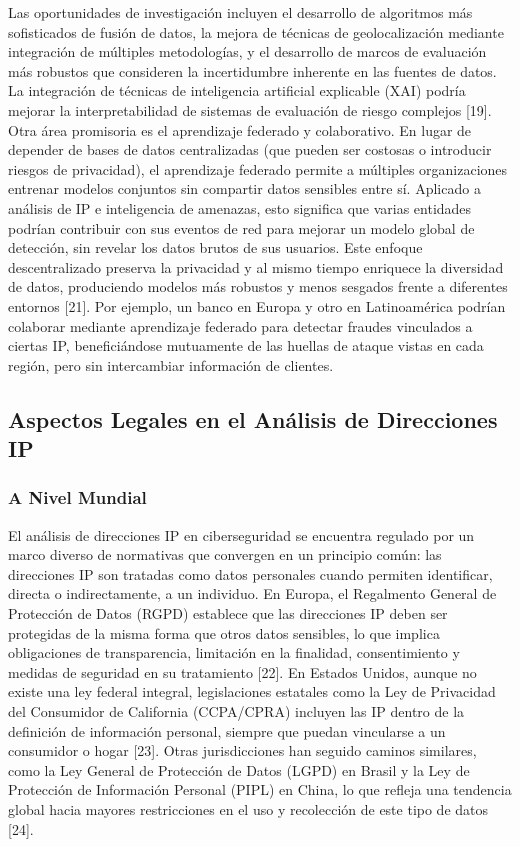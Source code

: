 Las oportunidades de investigación incluyen el desarrollo de algoritmos más sofisticados de fusión de datos, la mejora de técnicas de geolocalización mediante integración de múltiples metodologías, y el desarrollo de marcos de evaluación más robustos que consideren la incertidumbre inherente en las fuentes de datos. La integración de técnicas de inteligencia artificial explicable (XAI) podría mejorar la interpretabilidad de sistemas de evaluación de riesgo complejos [19]. \\
Otra área promisoria es el aprendizaje federado y colaborativo. En lugar de depender de bases de datos centralizadas (que pueden ser costosas o introducir riesgos de privacidad), el aprendizaje federado permite a múltiples organizaciones entrenar modelos conjuntos sin compartir datos sensibles entre sí. Aplicado a análisis de IP e inteligencia de amenazas, esto significa que varias entidades podrían contribuir con sus eventos de red para mejorar un modelo global de detección, sin revelar los datos brutos de sus usuarios. Este enfoque descentralizado preserva la privacidad y al mismo tiempo enriquece la diversidad de datos, produciendo modelos más robustos y menos sesgados frente a diferentes entornos [21]. Por ejemplo, un banco en Europa y otro en Latinoamérica podrían colaborar mediante aprendizaje federado para detectar fraudes vinculados a ciertas IP, beneficiándose mutuamente de las huellas de ataque vistas en cada región, pero sin intercambiar información de clientes.

\subsection{Aspectos Legales en el Análisis de Direcciones IP}
\subsubsection{A Nivel Mundial}
El análisis de direcciones IP en ciberseguridad se encuentra regulado por un marco diverso de normativas que convergen en un principio común: las direcciones IP son tratadas como datos personales cuando permiten identificar, directa o indirectamente, a un individuo. En Europa, el Regalmento General de Protección de Datos (RGPD) establece que las direcciones IP deben ser protegidas de la misma forma que otros datos sensibles, lo que implica obligaciones de transparencia, limitación en la finalidad, consentimiento y medidas de seguridad en su tratamiento [22]. En Estados Unidos, aunque no existe una ley federal integral, legislaciones estatales como la Ley de Privacidad del Consumidor de California (CCPA/CPRA) incluyen las IP dentro de la definición de información personal, siempre que puedan vincularse a un consumidor o hogar [23]. Otras jurisdicciones han seguido caminos similares, como la Ley General de Protección de Datos (LGPD) en Brasil y la Ley de Protección de Información Personal (PIPL) en China, lo que refleja una tendencia global hacia mayores restricciones en el uso y recolección de este tipo de datos [24].
